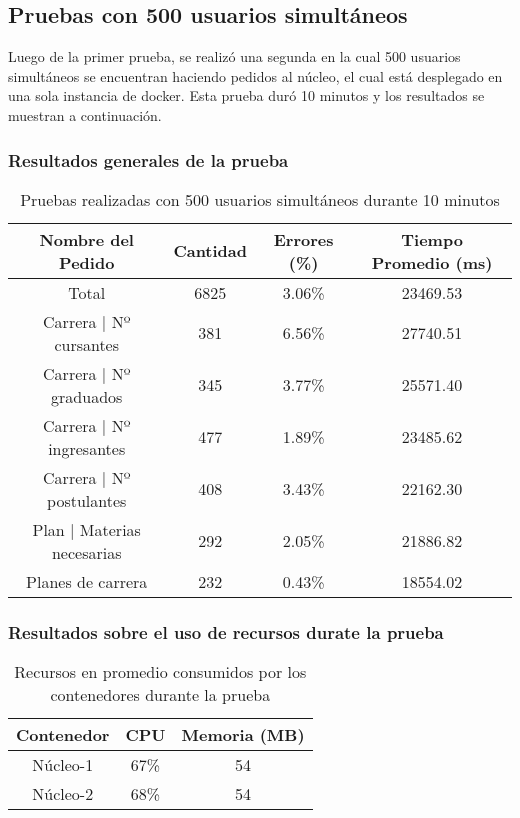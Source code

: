 \subsection{Pruebas con 500 usuarios simultáneos}
Luego de la primer prueba, se realizó una segunda en la cual 500 usuarios simultáneos se encuentran haciendo pedidos al núcleo, el cual está desplegado en una sola instancia de docker.
Esta prueba duró 10 minutos y los resultados se muestran a continuación.

\subsubsection{Resultados generales de la prueba}
\begin{table}[]
    \centering
    \makegapedcells
    \begin{tabular}{|c|c|c|c|}
    \hline
    Nombre del Pedido & Cantidad & Errores (\%) & Tiempo Promedio (ms) \\ \hline
    Total & 6825 & 3.06\% & 23469.53 \\ \hline
    Carrera | Nº cursantes & 381 & 6.56\% & 27740.51\\ \hline
    Carrera | Nº graduados & 345 & 3.77\% & 25571.40\\ \hline
    Carrera | Nº ingresantes & 477 & 1.89\% & 23485.62\\ \hline
    Carrera | Nº postulantes & 408 & 3.43\% & 22162.30\\ \hline
    Plan | Materias necesarias & 292 & 2.05\% & 21886.82\\ \hline
    Planes de carrera & 232 & 0.43\% & 18554.02\\ \hline

    \end{tabular}
    \caption{Pruebas realizadas con 500 usuarios simultáneos durante 10 minutos}
    \label{tab:tabla_planes}
\end{table}
\subsubsection{Resultados sobre el uso de recursos durate la prueba}
\begin{table}[]
    \centering
    \makegapedcells
    \begin{tabular}{|c|c|c}
    \hline
    Contenedor & CPU & Memoria (MB)\\ \hline
    Núcleo-1 & 67\% & 54 \\ \hline
    Núcleo-2 & 68\% & 54 \\ \hline
    \end{tabular}
    \caption{Recursos en promedio consumidos por los contenedores durante la prueba}
    \label{tab:tabla_planes}
\end{table}
